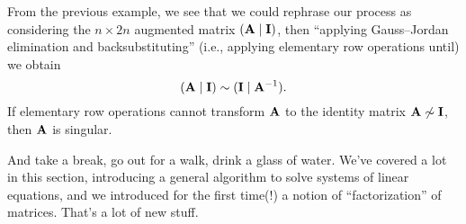 From the previous example, we see that we could rephrase our process as
considering the $n\times 2n$ augmented matrix $(\mathbf{A}\mid\mathbf{I})$,
then ``applying Gauss--Jordan elimination and backsubstituting'' (i.e.,
applying elementary row operations until) we obtain
\begin{equation}
(\mathbf{A}\mid\mathbf{I})\sim(\mathbf{I}\mid\mathbf{A}^{-1}).
\end{equation}
If elementary row operations cannot transform $\mathbf{A}$ to the identity
matrix $\mathbf{A}\not\sim\mathbf{I}$, then $\mathbf{A}$ is singular.


\vfill\eject

 And take a break, go out for a walk, drink a glass of water.
We've covered a lot in this section, introducing a general algorithm to
solve systems of linear equations, and we introduced for the first
time(!) a notion of ``factorization'' of matrices. That's a lot of new
stuff.